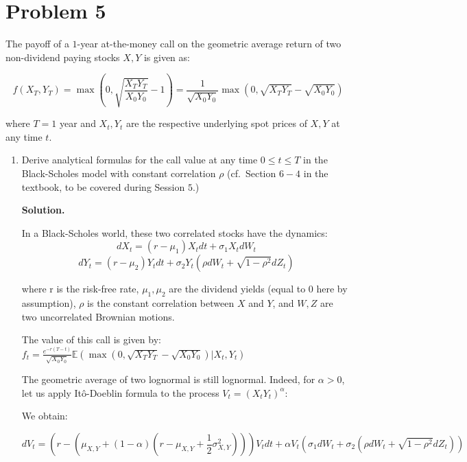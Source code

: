 \documentclass[12pt]{article}
\newenvironment{solution}{\vspace{0.2cm} \textbf{Solution.}}{}
\begin{document}
\newpage

\section*{Problem 5}
The payoff of a $1$-year at-the-money call on the geometric average return of two non-dividend paying stocks $X, Y$ is given as:

$$ f(X_T,Y_T) = \max\left(0, \sqrt{\frac{X_T Y_T}{X_0 Y_0}} - 1\right) = \frac{1}{\sqrt{X_0 Y_0}}\max\left(0, \sqrt{X_T Y_T} - \sqrt{X_0 Y_0}\right)$$

where $T = 1$ year and $X_t, Y_t$ are the respective underlying spot prices of $X, Y$ at any time $t$.
	
	\begin{enumerate}[label=(\alph*)]
		
		\item Derive analytical formulas for the call value at any time $0 \leq t \leq T$ in the Black-Scholes model with constant correlation $\rho$ (cf.\ Section $6-4$ in the textbook, to be covered during Session $5$.)
		
		\begin{solution}
			
			In a Black-Scholes world, these two correlated stocks have the dynamics:
			$$ dX_t = (r-\mu_1) X_t dt + \sigma_1 X_t dW_t$$
			$$ dY_t = (r-\mu_2) Y_t dt + \sigma_2 Y_t (\rho dW_t + \sqrt{1 - \rho^2}dZ_t)$$
			
			where r is the risk-free rate, $\mu_1, \mu_2$ are the dividend yields (equal to 0 here by assumption), $\rho$ is the constant correlation between $X$ and $Y$, and $W,Z$ are two uncorrelated Brownian motions.
			
			The value of this call is given by: $f_t = \frac{e^{-r(T-t)}}{\sqrt{X_0 Y_0}} \mathbb{E}\left(\max\left(0, \sqrt{X_T Y_T} - \sqrt{X_0 Y_0}\right) \vert X_t,Y_t \right)$
			
			The geometric average of two lognormal is still lognormal. Indeed, for $\alpha > 0$, let us apply Itô-Doeblin formula to the process $V_t = (X_tY_t)^{\alpha}$:
			
			We obtain:
			
			\begin{dmath*}
			dV_t = \left(r - \left(\mu_{X,Y} + \left(1-\alpha\right) \left(r - \mu_{X,Y} + \frac{1}{2} \sigma_{X,Y}^2 \right)\right)\right) V_t dt + \alpha V_t \left( \sigma_1 dW_t + \sigma_2 \left(\rho dW_t + \sqrt{1 - \rho^2}dZ_t \right)\right)
			\end{dmath*}
		

\end{solution}
\end{enumerate}
\end{document}
